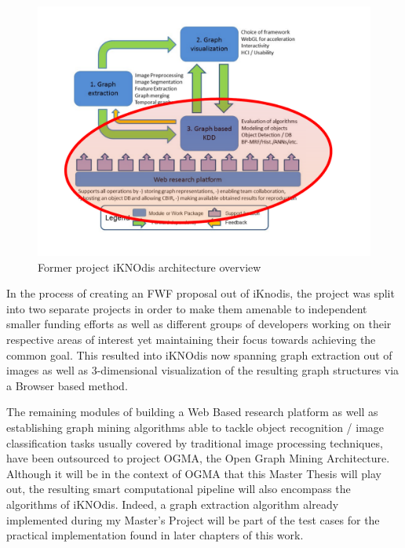\par

\begin{figure}[ht]
	\label{fig_iKNOdis_structure}
	\includegraphics[width=1.1\textwidth]{figures/iKNOdis_OGMA_structure}
	\caption{Former project iKNOdis architecture overview}
\end{figure}


In the process of creating an FWF proposal out of iKnodis, the project was split into two separate projects in order to make them amenable to independent smaller funding efforts as well as different groups of developers working on their respective areas of interest yet maintaining their focus towards achieving the common goal. This resulted into iKNOdis now spanning graph extraction out of images as well as 3-dimensional visualization of the resulting graph structures via a Browser based method. 

The remaining modules of building a Web Based research platform as well as establishing graph mining algorithms able to tackle object recognition / image classification tasks usually covered by traditional image processing techniques, have been outsourced to project OGMA, the Open Graph Mining Architecture. Although it will be in the context of OGMA that this Master Thesis will play out, the resulting smart computational pipeline will also encompass the algorithms of iKNOdis. Indeed, a graph extraction algorithm already implemented during my Master's Project \cite{GraphExtractPaper} will be part of the test cases for the practical implementation found in later chapters of this work. 


